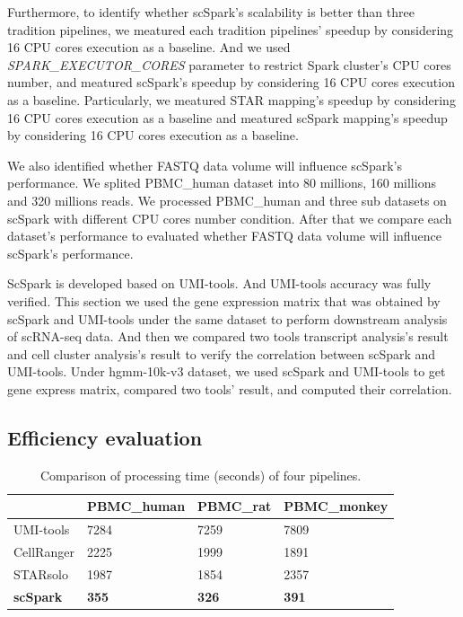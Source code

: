 \documentclass[conference]{IEEEtran}
\begin{document}
Furthermore, to identify whether scSpark's scalability is better than three tradition pipelines, 
we meatured each tradition pipelines' speedup by considering 16 CPU cores execution as a baseline.
And we used \textit{SPARK\_EXECUTOR\_CORES} parameter to restrict Spark cluster's CPU cores number, and meatured scSpark's speedup by considering 16 CPU cores execution as a baseline.
Particularly, we meatured STAR mapping's speedup by considering 16 CPU cores execution as a baseline and meatured scSpark mapping's speedup by considering 16 CPU cores execution as a baseline.

We also identified whether FASTQ data volume will influence scSpark's performance.
We splited PBMC\_human dataset into 80 millions, 160 millions and 320 millions reads.
We processed PBMC\_human and three sub datasets on scSpark with different CPU cores number condition.
After that we compare each dataset's performance to evaluated whether FASTQ data volume will influence scSpark's performance.

ScSpark is developed based on UMI-tools. 
And UMI-tools accuracy was fully verified. 
This section we used the gene expression matrix that was obtained by scSpark and UMI-tools under the same dataset to perform downstream analysis of scRNA-seq data. 
And then we compared two tools transcript analysis's result and cell cluster analysis's result to verify the correlation between scSpark and UMI-tools. 
Under hgmm-10k-v3 dataset, we used scSpark and UMI-tools to get gene express matrix, compared two tools' result, and computed their correlation.


\subsection{Efficiency evaluation}

\begin{table}
	\centering
	\caption{Comparison of processing time (seconds) of four pipelines.}\label{tab1}
	\begin{tabular}{l | l | l | l }
		\hline
		 & PBMC\_human & PBMC\_rat & PBMC\_monkey \\ 
		\hline
		UMI-tools & 7284 & 7259 & 7809 \\
		CellRanger & 2225 & 1999 & 1891 \\
		STARsolo & 1987 & 1854 & 2357 \\
		\textbf{scSpark} & \textbf{355} & \textbf{326} & \textbf{391} \\
		\hline
	\end{tabular}
\end{table}
\end{document}
